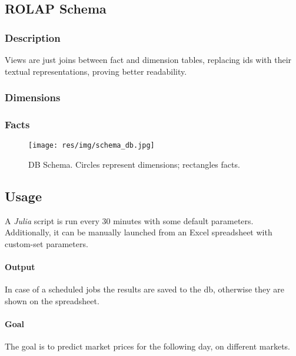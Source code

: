 \subsection{ROLAP Schema}
    \subsubsection{Description}
        Views are just joins between fact and dimension tables, replacing ids with their textual representations, proving better readability.

    \subsubsection{Dimensions}
        
        
    \subsubsection{Facts}
        
        
    \begin{figure}
        \centering
        \texttt{[image: res/img/schema\_db.jpg]}
        \caption{DB Schema. Circles represent dimensions; rectangles facts.}
        \label{fig:db_schema}
    \end{figure}
    
\subsection{Usage}
    A \textit{Julia} script is run every 30 minutes with some default parameters.
    Additionally, it can be manually launched from an Excel spreadsheet with custom-set parameters.
    
    \paragraph{Output} In case of a scheduled jobs the results are saved to the db, otherwise they are shown on the spreadsheet.
    
    \paragraph{Goal} The goal is to predict market prices for the following day, on different markets.
    
